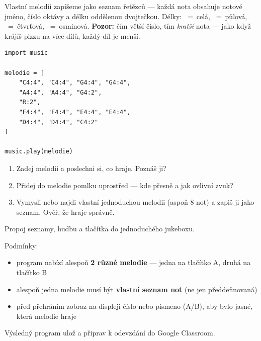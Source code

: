 \begin{ukol}

Vlastní melodii zapíšeme jako seznam řetězců — každá nota obsahuje notové jméno,
číslo oktávy a délku oddělenou dvojtečkou.
Délky: ~=~celá, ~=~půlová, ~=~čtvrťová, ~=~osminová.
\textbf{Pozor:} čím větší číslo, tím \emph{kratší} nota — jako když krájíš pizzu
na více dílů, každý díl je menší.

\begin{lstlisting}
import music

melodie = [
    "C4:4", "C4:4", "G4:4", "G4:4",
    "A4:4", "A4:4", "G4:2",
    "R:2",
    "F4:4", "F4:4", "E4:4", "E4:4",
    "D4:4", "D4:4", "C4:2"
]

music.play(melodie)
\end{lstlisting}

\begin{enumerate}
  \item Zadej melodii a poslechni si, co hraje. Poznáš ji?
  \item Přidej do melodie pomlku  uprostřed — kde přesně a jak ovlivní zvuk?
  \item Vymysli nebo najdi vlastní jednoduchou melodii (aspoň 8 not) a zapiš ji jako seznam.
        Ověř, že hraje správně.
\end{enumerate}

\odpoved[3cm]

\end{ukol}

\begin{ukol}[Jukebox]

Propoj seznamy, hudbu a tlačítka do jednoduchého jukeboxu.

\medskip
Podmínky:
\begin{itemize}
  \item program nabízí alespoň \textbf{2 různé melodie} — jedna na tlačítko A,
        druhá na tlačítko B
  \item alespoň jedna melodie musí být \textbf{vlastní seznam not}
        (ne jen předdefinovaná)
  \item před přehráním zobraz na displeji číslo nebo písmeno (A/B),
        aby bylo jasné, která melodie hraje
\end{itemize}

\odpoved[5cm]

\noindent Výsledný program ulož a připrav k odevzdání do Google Classroom.

\end{ukol}

